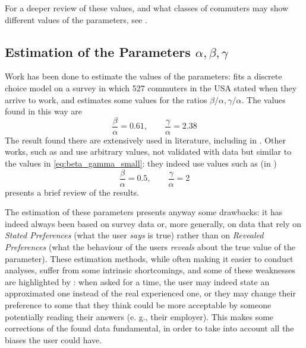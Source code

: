 For a deeper review of these values, and what classes of commuters may show different values of the parameters,
see \textcite{LindseyBook}.

\subsection{Estimation of the Parameters $\alpha, \beta, \gamma$}
\label{sec:estim-param-alpha}

Work has been done to estimate the values of the parameters:
\textcite{54d203ee-4bf8-3234-9286-56e4c8b7f5bd} fits a discrete choice model on a survey in which 527 commuters in the USA stated when they arrive to work, and estimates some values for the ratios \(\beta/\alpha, \gamma/\alpha\).
The values found in this way are
\begin{equation}
  \label{eq:beta_gamma_small}
  \frac{\beta}{\alpha} = 0.61,\qquad \frac{\gamma}{\alpha} = 2.38
\end{equation}
The result found there are extensively used in literature, including in \textcite{d0907f84-e14a-3d98-ad20-759f41491d6e}.
Other works, such as \textcite{doi:10.3141/1807-04} and \textcite{4ffb5da1-1f49-3898-98a7-209781744dc0} use arbitrary values,
not validated with data but similar to the values in \eqref{eq:beta_gamma_small}:
they indeed use values such as (in \cite{4ffb5da1-1f49-3898-98a7-209781744dc0})
\begin{equation}
  \label{eq:beta_gamma_vickrey}
  \frac{\beta}{\alpha} = 0.5,\qquad \frac{\gamma}{\alpha} = 2
\end{equation}
\textcite{https://doi.org/10.1111/iere.12692} presents a brief review of the results.

The estimation of these parameters presents anyway some drawbacks:
it has indeed always been based on survey data or,
more generally, on data that rely on \textit{Stated Preferences} (what the user \textit{says} is true)
rather than on \textit{Revealed Preferences} (what the behaviour of the users \textit{reveals} about the true value of the parameter).
These estimation methods, while often making it easier to conduct analyses,
suffer from some intrinsic shortcomings,
and some of these weaknesses are highlighted by \textcite{54d203ee-4bf8-3234-9286-56e4c8b7f5bd}:
when asked for a time, the user may indeed state an approximated one instead of the real experienced one,
or they may change their preference to some that they think could be more acceptable by someone potentially reading their answers (e. g., their employer).
This makes some corrections of the found data fundamental,
in order to take into account all the biases the user could have.

